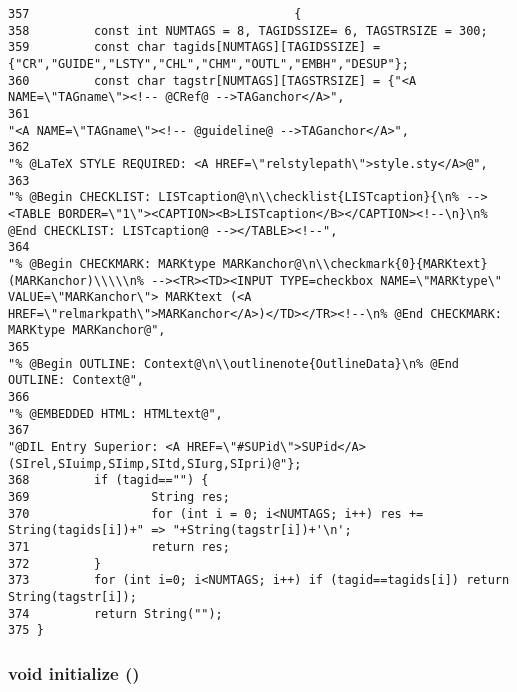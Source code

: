 \footnotesize\begin{verbatim}357                                     {
358         const int NUMTAGS = 8, TAGIDSSIZE= 6, TAGSTRSIZE = 300;
359         const char tagids[NUMTAGS][TAGIDSSIZE] = {"CR","GUIDE","LSTY","CHL","CHM","OUTL","EMBH","DESUP"};
360         const char tagstr[NUMTAGS][TAGSTRSIZE] = {"<A NAME=\"TAGname\"><!-- @CRef@ -->TAGanchor</A>",
361                                                                                 "<A NAME=\"TAGname\"><!-- @guideline@ -->TAGanchor</A>",
362                                                                                 "% @LaTeX STYLE REQUIRED: <A HREF=\"relstylepath\">style.sty</A>@",
363                                                                                 "% @Begin CHECKLIST: LISTcaption@\n\\checklist{LISTcaption}{\n% --><TABLE BORDER=\"1\"><CAPTION><B>LISTcaption</B></CAPTION><!--\n}\n% @End CHECKLIST: LISTcaption@ --></TABLE><!--",
364                                                                                 "% @Begin CHECKMARK: MARKtype MARKanchor@\n\\checkmark{0}{MARKtext} (MARKanchor)\\\\\n% --><TR><TD><INPUT TYPE=checkbox NAME=\"MARKtype\" VALUE=\"MARKanchor\"> MARKtext (<A HREF=\"relmarkpath\">MARKanchor</A>)</TD></TR><!--\n% @End CHECKMARK: MARKtype MARKanchor@",
365                                                                                 "% @Begin OUTLINE: Context@\n\\outlinenote{OutlineData}\n% @End OUTLINE: Context@",
366                                                                                 "% @EMBEDDED HTML: HTMLtext@",
367                                                                                 "@DIL Entry Superior: <A HREF=\"#SUPid\">SUPid</A> (SIrel,SIuimp,SIimp,SItd,SIurg,SIpri)@"};
368         if (tagid=="") {
369                 String res;
370                 for (int i = 0; i<NUMTAGS; i++) res += String(tagids[i])+" => "+String(tagstr[i])+'\n';
371                 return res;
372         }
373         for (int i=0; i<NUMTAGS; i++) if (tagid==tagids[i]) return String(tagstr[i]);
374         return String("");
375 }
\end{verbatim}\normalsize 
{}
\subsubsection{\setlength{\rightskip}{0pt plus 5cm}void initialize ()}\label{dil2al_8cc_a101}




